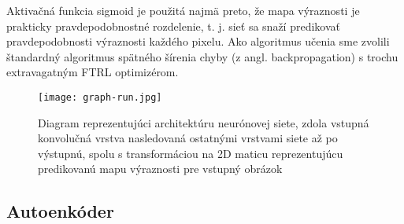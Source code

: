 Aktivačná funkcia sigmoid je použitá najmä preto, že mapa výraznosti je prakticky pravdepodobnostné rozdelenie, t. j. sieť sa snaží predikovať pravdepodobnosti výraznosti každého pixelu. Ako algoritmus učenia sme zvolili štandardný algoritmus spätného šírenia chyby (z angl. backpropagation) s trochu extravagatným FTRL optimizérom.

\begin{figure}[H]
	\begin{center}\texttt{[image: graph-run.jpg]}
		\caption[Návrh architektúry neurónovej siete]{
			Diagram reprezentujúci architektúru neurónovej siete, zdola vstupná konvolučná vrstva nasledovaná ostatnými vrstvami siete až po výstupnú, spolu s transformáciou na 2D maticu reprezentujúcu predikovanú mapu výraznosti pre vstupný obrázok
		}\label{my_tensorboard_cnn}
	\end{center}
\end{figure}

\subsection{Autoenkóder}
\label{autoencoder_design}





